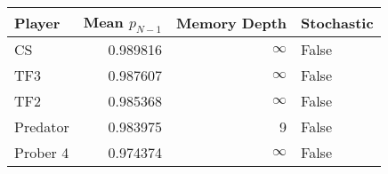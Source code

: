 \begin{tabular}{lrrl}
\toprule
   Player &  Mean $p_{N-1}$ &  Memory Depth & Stochastic \\
\midrule
       CS &        0.989816 &            \(\infty\) &      False \\
      TF3 &        0.987607 &            \(\infty\) &      False \\
      TF2 &        0.985368 &            \(\infty\) &      False \\
 Predator &        0.983975 &             9 &      False \\
 Prober 4 &        0.974374 &            \(\infty\) &      False \\
\bottomrule
\end{tabular}
